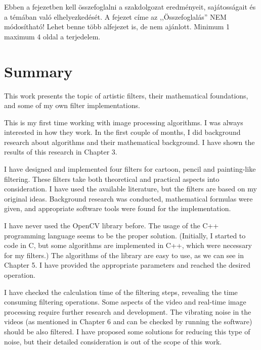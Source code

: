 
\label{Chap:osszefoglalas}

Ebben a fejezetben kell összefoglalni a szakdolgozat eredményeit, sajátosságait és a témában való elhelyezkedését. A fejezet címe az ,,Összefoglalás'' NEM módosítható! Lehet benne több alfejezet is, de nem ajánlott. Minimum 1 maximum 4 oldal a terjedelem. 

\pagestyle{empty}
\newpage

\section*{Summary}

This work presents the topic of artistic filters, their mathematical foundations, and some of my own filter implementations. 

This is my first time working with image processing algorithms. I was always interested in how they work. In the first couple of months, I did background research about algorithms and their mathematical background. I have shown the results of this research in Chapter 3. 

I have designed and implemented four filters for cartoon, pencil and painting-like filtering. These filters take both theoretical and practical aspects into consideration. I have used the available literature, but the filters are based on my original ideas. Background research was conducted, mathematical formulas were given, and appropriate software tools were found for the implementation. 

I have never used the OpenCV library before. The usage of the C++ programming language seems to be the proper solution. (Initially, I started to code in C, but some algorithms are implemented in C++, which were necessary for my filters.) The algorithms of the library are easy to use, as we can see in Chapter 5. I have provided the appropriate parameters and reached the desired operation. 

I have checked the calculation time of the filtering steps, revealing the time consuming filtering operations. Some aspects of the video and real-time image processing require further research and development. The vibrating noise in the videos (as mentioned in Chapter 6 and can be checked by running the software) should be also filtered. I have proposed some solutions for reducing this type of noise, but their detailed consideration is out of the scope of this work.